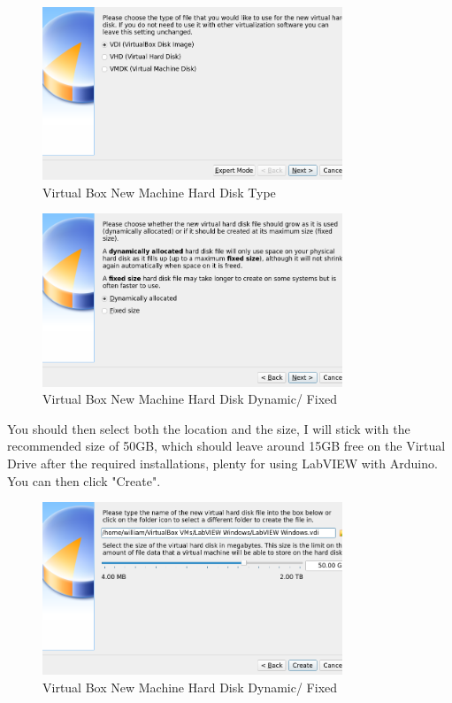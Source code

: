 \documentclass[a4paper,11pt]{report}
\begin{document}
\begin{figure}[H]
\centering
\includegraphics[width=0.8\textwidth]{screenshots/virtualboxharddiskvdi}
\caption{Virtual Box New Machine Hard Disk Type}
\end{figure}

\begin{figure}[H]
\centering
\includegraphics[width=0.8\textwidth]{screenshots/virtualboxharddiskdynamic}
\caption{Virtual Box New Machine Hard Disk Dynamic/ Fixed}
\end{figure}

You should then select both the location and the size, I will stick with the recommended size of 50GB, which should leave around 15GB free on the Virtual Drive after the required installations, plenty for using LabVIEW with Arduino. You can then click "Create".

\begin{figure}[H]
\centering
\includegraphics[width=0.8\textwidth]{screenshots/virtualboxharddisksize}
\caption{Virtual Box New Machine Hard Disk Dynamic/ Fixed}
\end{figure}
\end{document}
